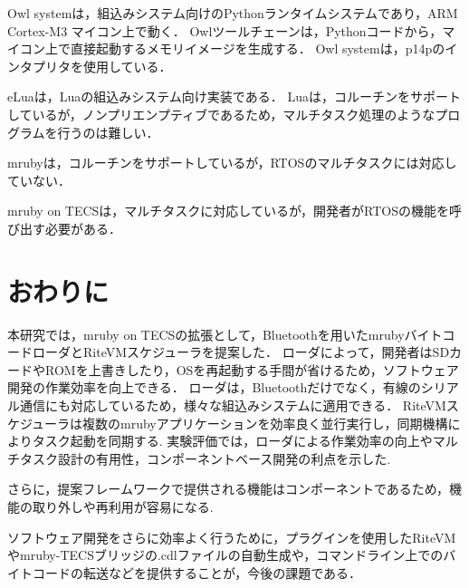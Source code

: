 \documentclass[submit,techrep]{ipsj}
\begin{document}
Owl systemは，組込みシステム向けのPythonランタイムシステムであり，ARM Cortex-M3 マイコン上で動く．
Owlツールチェーンは，Pythonコードから，マイコン上で直接起動するメモリイメージを生成する．
Owl systemは，p14pのインタプリタを使用している．

eLuaは，Luaの組込みシステム向け実装である．
Luaは，コルーチンをサポートしているが，ノンプリエンプティブであるため，マルチタスク処理のようなプログラムを行うのは難しい．

mrubyは，コルーチンをサポートしているが，RTOSのマルチタスクには対応していない．

mruby on TECSは，マルチタスクに対応しているが，開発者がRTOSの機能を呼び出す必要がある．


\vspace{-2mm}
\section{おわりに}
\vspace{-2mm}
\label{sec:Conclusion}
本研究では，mruby on TECSの拡張として，Bluetoothを用いたmrubyバイトコードローダとRiteVMスケジューラを提案した．
ローダによって，開発者はSDカードやROMを上書きしたり，OSを再起動する手間が省けるため，ソフトウェア開発の作業効率を向上できる．
ローダは，Bluetoothだけでなく，有線のシリアル通信にも対応しているため，様々な組込みシステムに適用できる．
RiteVMスケジューラは複数のmrubyアプリケーションを効率良く並行実行し，同期機構によりタスク起動を同期する.
実験評価では，ローダによる作業効率の向上やマルチタスク設計の有用性，コンポーネントベース開発の利点を示した.

さらに，提案フレームワークで提供される機能はコンポーネントであるため，機能の取り外しや再利用が容易になる.

ソフトウェア開発をさらに効率よく行うために，プラグインを使用したRiteVMやmruby-TECSブリッジの.cdlファイルの自動生成や，コマンドライン上でのバイトコードの転送などを提供することが，今後の課題である．
\end{document}
